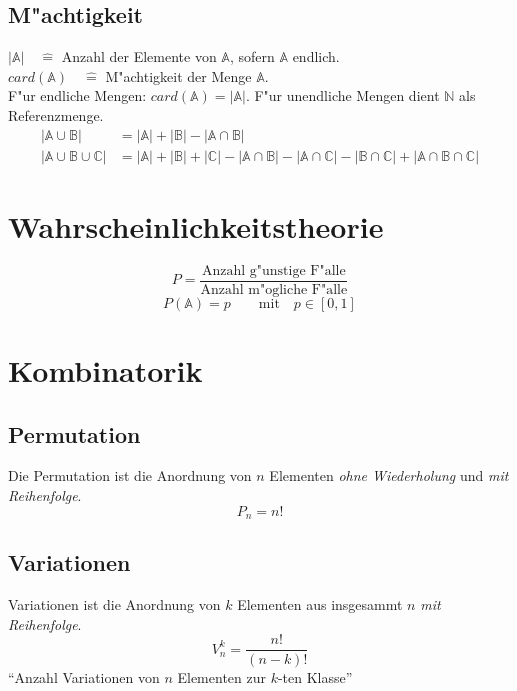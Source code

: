 \subsection{M"achtigkeit}
$|\mathbb{A}|\quad\hat{=}$ Anzahl der Elemente von $\mathbb{A}$, sofern $\mathbb{A}$ endlich. \\
\noindent $card(\mathbb{A})\quad\hat{=}$ M"achtigkeit der Menge $\mathbb{A}$. \\
\noindent F"ur endliche Mengen: $card(\mathbb{A})=|\mathbb{A}|$. F"ur unendliche Mengen dient $\mathbb{N}$ als Referenzmenge.
\begin{align*}
	|\mathbb{A}\cup\mathbb{B}| &= |\mathbb{A}|+|\mathbb{B}|-|\mathbb{A}\cap\mathbb{B}| \\
	|\mathbb{A}\cup\mathbb{B}\cup\mathbb{C}| &= |\mathbb{A}|+|\mathbb{B}|+|\mathbb{C}|-|\mathbb{A}\cap\mathbb{B}|-|\mathbb{A}\cap\mathbb{C}|-|\mathbb{B}\cap\mathbb{C}|+|\mathbb{A}\cap\mathbb{B}\cap\mathbb{C}|
\end{align*}

\section{Wahrscheinlichkeitstheorie}
\begin{equation}
	P=\frac{\text{Anzahl g"unstige F"alle}}{\text{Anzahl m"ogliche F"alle}}
\end{equation}
\begin{equation*}
	P(\mathbb{A}) = p\qquad\text{mit}\quad p\in [0,1]
\end{equation*}

\section{Kombinatorik}
\subsection{Permutation}
Die Permutation ist die Anordnung von $n$ Elementen {\em ohne Wiederholung} und {\em mit Reihenfolge}.
\begin{equation}
	P_n=n!
\end{equation}

\subsection{Variationen}
Variationen ist die Anordnung von $k$ Elementen aus insgesammt $n$ {\em mit Reihenfolge}.
\begin{equation}
	V_n^k=\frac{n!}{(n-k)!}
\end{equation}
\noindent ``Anzahl Variationen von $n$ Elementen zur $k$-ten Klasse''

